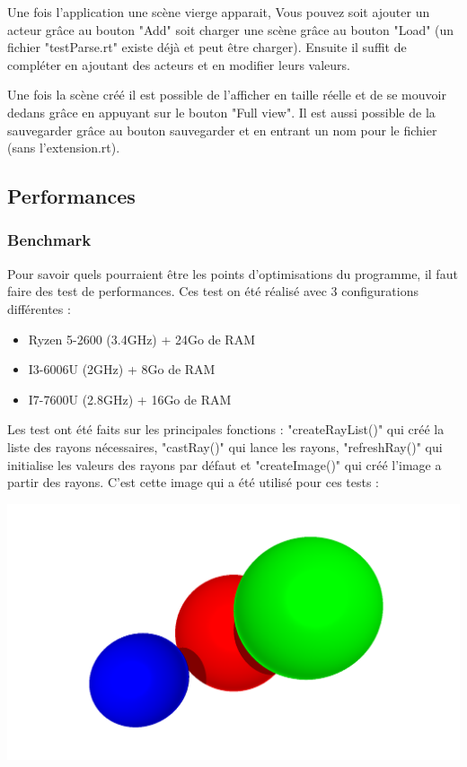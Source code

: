 \documentclass[12pt]{article}
\begin{document}
		  	Une fois l'application une scène vierge apparait, Vous pouvez soit ajouter un acteur grâce au bouton "Add" soit charger une scène grâce au bouton "Load" (un fichier "testParse.rt" existe déjà et peut être charger). Ensuite il suffit de compléter en ajoutant des acteurs et en modifier leurs valeurs.
		  	
		  	Une fois la scène créé il est possible de l'afficher en taille réelle et de se mouvoir dedans grâce en appuyant sur le bouton "Full view". Il est aussi possible de la sauvegarder grâce au bouton sauvegarder et en entrant un nom pour le fichier (sans l'extension.rt). 
		\subsection{Performances}
			\subsubsection{Benchmark}
			Pour savoir quels pourraient être les points d'optimisations du programme, il faut faire des test de performances. Ces test on été réalisé avec 3 configurations différentes :
			
			\begin{itemize}
				\item Ryzen 5-2600 (3.4GHz) + 24Go de RAM
				\item I3-6006U (2GHz) + 8Go de RAM
				\item I7-7600U (2.8GHz) + 16Go de RAM
			\end{itemize}
			
			Les test ont été faits sur les principales fonctions : "createRayList()" qui créé la liste des rayons nécessaires, "castRay()" qui lance les rayons, "refreshRay()" qui initialise les valeurs des rayons par défaut et "createImage()" qui créé l'image a partir des rayons.
			C'est cette image qui a été utilisé pour ces tests :
			\begin{center}
			\includegraphics[scale=0.3]{./images/imgTest.png}
			\end{center}
			
\end{document}

